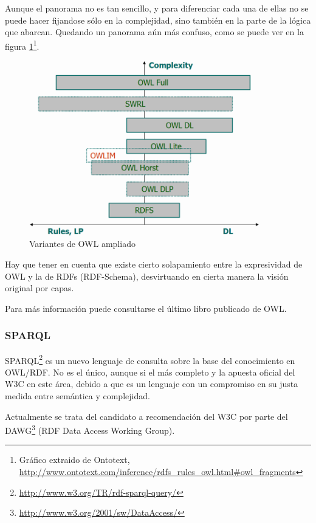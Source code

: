 Aunque el panorama no es tan sencillo, y para diferenciar cada una de ellas no
se puede hacer fijandose sólo en la complejidad, sino también en la parte de la 
lógica que abarcan. Quedando un panorama aún más confuso, como se puede ver en 
la figura \ref{fig:owlVariantsExtended}\footnote{Gráfico extraido de Ontotext, 
\url{http://www.ontotext.com/inference/rdfs_rules_owl.html#owl_fragments}}.

\begin{figure}[tp]
	\centering
	\includegraphics[width=10cm]{images/owl-dialects.png}
	\caption{Variantes de OWL ampliado}
	\label{fig:owlVariantsExtended}
\end{figure}

Hay que tener en cuenta que existe cierto solapamiento entre la expresividad de
OWL y la de RDFs (RDF-Schema), desvirtuando en cierta manera la visión original
por capas.

Para más información puede consultarse el último libro publicado de 
OWL\cite{OWLBook}.

\subsubsection{SPARQL}

SPARQL\footnote{\url{http://www.w3.org/TR/rdf-sparql-query/}} es un nuevo lenguaje
de consulta sobre la base del conocimiento en OWL/RDF. No es el único\cite{ComparisonRDFQuery},
aunque si el más completo y la apuesta oficial del W3C en este área, debido a que es
un lenguaje con un compromiso en su justa medida entre semántica y 
complejidad\cite{SemanticsComplexitySPARQL}. 

Actualmente se trata del candidato a recomendación del W3C por parte del 
DAWG\footnote{\url{http://www.w3.org/2001/sw/DataAccess/}} (RDF Data Access Working 
Group).

